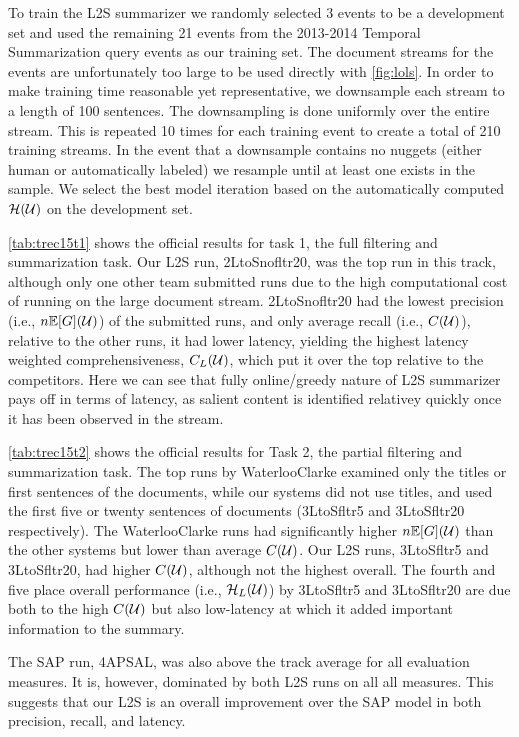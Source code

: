 To train the L2S summarizer we randomly selected 3 events to be a development
set and used the remaining 21 events from the 2013-2014 Temporal Summarization
query events as our training set. The document streams for the events
are unfortunately too large to be used directly with \autoref{fig:lols}.
In order to
 make training time reasonable yet representative, we downsample each stream
 to a length of 100 sentences. The downsampling is done uniformly over the
 entire stream. This is repeated 10 times for each training event to create a
 total of 210 training streams. In the event that a downsample contains no
 nuggets (either human or automatically labeled) we resample until at least
 one exists in the sample. 
 We select the best model iteration based on the automatically computed
$\mathcal{H}(\mathcal{U})$ on the development set.



\autoref{tab:trec15t1} shows the official results for task 1, the full
filtering and summarization task. Our L2S run, 2LtoSnofltr20, was the top run
in this track, although only one other team submitted runs due to the high
computational cost of running on the large document stream.  2LtoSnofltr20 had
the lowest precision (i.e., $n\mathbb{E}[G](\mathcal{U})$) of the
submitted runs, and only average recall (i.e., $C(\mathcal{U})$),
relative to the other runs, it had lower latency, yielding the highest 
latency weighted comprehensiveness, $C_L(\mathcal{U})$, which 
put it over the top relative to the competitors. Here we can see that 
fully online/greedy nature of L2S summarizer pays off in terms of latency,
as salient content is identified relativey quickly once it has been observed
in the stream.




\autoref{tab:trec15t2} shows the official results for Task 2, the partial
filtering and summarization task. The top runs by WaterlooClarke examined
only the titles or first sentences of the documents, while our systems did not
use titles, and used the first five or twenty sentences of documents (3LtoSfltr5 and
3LtoSfltr20 respectively). The WaterlooClarke runs had significantly
higher $n\mathbb{E}[G](\mathcal{U})$ than the other systems but lower
than average $C(\mathcal{U})$. Our L2S runs, 3LtoSfltr5 and
3LtoSfltr20, had higher $C(\mathcal{U})$, although not the highest overall. The fourth and five place overall performance (i.e., $\mathcal{H}_L(\mathcal{U})$) by 3LtoSfltr5 and
3LtoSfltr20 are due both to the high $C(\mathcal{U})$ but also low-latency at which it added important information to the summary.

The SAP run, 4APSAL, was also above the track average for all evaluation
measures. It is, however, dominated by both L2S runs on all all measures.
This suggests that our L2S is an overall improvement over the SAP model in
both precision, recall, and latency. 




